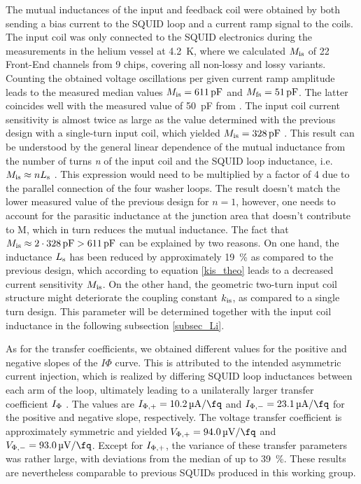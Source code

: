 The mutual inductances of the input and feedback coil were obtained by both sending a bias current to the SQUID loop and a current ramp signal to the coils. The input coil was only connected to the SQUID electronics during the measurements in the helium vessel at \qty{4.2}{\kelvin}, where we calculated $M_{\rm is}$ of 22 Front-End channels from 9 chips, covering all non-lossy and lossy variants. Counting the obtained voltage oscillations per given current ramp amplitude leads to the measured median values $M_{\rm is}=\qty{611}{\pico\farad}$ and $M_{\rm fs}=\qty{51}{\pico\farad}$. The latter coincides well with the measured value of \qty{50}{\pico\farad} from \cite{Bauer2022}. The input coil current sensitivity is almost twice as large as the value determined with the previous design with a single-turn input coil, which yielded $M_{\rm is}=\qty{328}{\pico\farad}$ \cite{Bauer2022}. This result can be understood by the general linear dependence of the mutual inductance from the number of turns \textit{n} of the input coil and the SQUID loop inductance, i.e. $M_{\rm is}\approx nL_{\rm s}$ \cite{Ketchen1981}. This expression would need to be multiplied by a factor of 4 due to the parallel connection of the four washer loops. The result doesn't match the lower measured value of the previous design for $n=1$, however, one needs to account for the parasitic inductance at the junction area that doesn't contribute to M, which in turn reduces the mutual inductance. The fact that $M_{\rm is}\approx 2\cdot \qty{328}{\pico\farad}>\qty{611}{\pico\farad}$ can be explained by two reasons. On one hand, the inductance $L_{\rm s}$ has been reduced by approximately \qty{19}{\percent} as compared to the previous design, which according to equation \ref{kis_theo} leads to a decreased current sensitivity $M_{\rm is}$. On the other hand, the geometric two-turn input coil structure might deteriorate the coupling constant $k_{\rm is}$, as compared to a single turn design. This parameter will be determined together with the input coil inductance in the following subsection \ref{subsec_Li}.

As for the transfer coefficients, we obtained different values for the positive and negative slopes of the $I\Phi$ curve. This is attributed to the intended asymmetric current injection, which is realized by differing SQUID loop inductances between each arm of the loop, ultimately leading to a unilaterally larger transfer coefficient $I_{\rm \Phi}$ \cite{Ferring2015}. The values are $I_{\rm \Phi,+}=\qty{10.2}{\micro\ampere\per\fq}$ and $I_{\rm \Phi,-}=\qty{23.1}{\micro\ampere\per\fq}$ for the positive and negative slope, respectively. The voltage transfer coefficient is approximately symmetric and yielded $V_{\rm \Phi,+}=\qty{94.0}{\micro\volt\per\fq}$ and $V_{\rm \Phi,-}=\qty{93.0}{\micro\volt\per\fq}$. Except for $I_{\rm \Phi,+}$, the variance of these transfer parameters was rather large, with deviations from the median of up to \qty{39}{\percent}. These results are nevertheless comparable to previous SQUIDs produced in this working group.      


